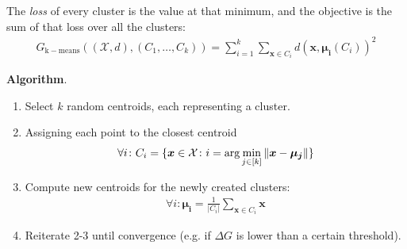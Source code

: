 \documentclass[../template.tex]{subfiles}
\begin{document}
\begin{itemize}
    The \textit{loss} of every cluster is the value at that minimum, and the objective is the sum of that loss over all the clusters:
    \begin{align*}
        G_{\mathrm{k-means}}((\mathcal{X},d), (C_1, \dots, C_k)) = \sum_{i=1}^k \sum_{\bm{x} \in C_i} d(\bm{x}, \bm{\mu_i}(C_i))^2
    \end{align*} 
    
    \textbf{Algorithm}. 
    \begin{enumerate}
        \item Select $k$ random centroids, each representing a cluster.
        \item Assigning each point to the closest centroid
        \begin{align*}
            \forall i \colon C_i = \{\bm{x} \in \mathcal{X}\colon i = \arg\min_{j \in [k]} \norm{\bm{x}-\bm{\mu_j}}\}
        \end{align*}
        \item Compute new centroids for the newly created clusters:
        \begin{align*}
            \forall i\colon \bm{\mu_i} = \frac{1}{|C_i|} \sum_{\bm{x} \in C_i} \bm{x} 
        \end{align*}
        \item Reiterate 2-3 until convergence (e.g. if $\Delta G$ is lower than a certain threshold).
    \end{enumerate}
     
\end{itemize}
\end{document}

